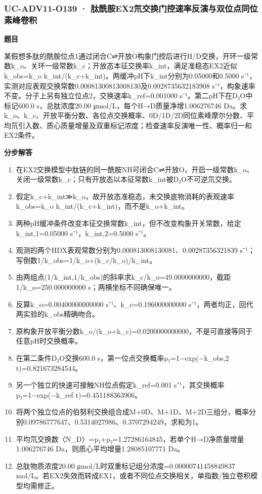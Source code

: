 \documentclass[UTF8,11pt,a4paper]{ctexart}
\begin{document}
\subsubsection*{UC-ADV11-O139 · 肽酰胺EX2氘交换门控速率反演与双位点同位素峰卷积}
\noindent\textbf{题目}\par
某假想多肽的酰胺位点1通过闭合C⇌开放O构象门控后进行H/D交换，开环一级常数k\_o、关环一级常数k\_c；开放态本征交换率k\_int，满足准稳态EX2近似k\_obs=k\_o k\_int/(k\_c+k\_int)。两缓冲pH下k\_int分别为0.05000和0.5000 s⁻¹，实测对应表观交换常数0.00081300813008130及0.0028735632183908 s⁻¹，构象速率不变。分子上另有独立位点2，交换速率k\_ref=0.001000 s⁻¹。第二pH下在D₂O中标记600.0 s，总肽浓度20.00 μmol/L，每个H→D质量净增1.006276746 Da。求k\_o、k\_c、开放平衡分数、各位点交换概率、0D/1D/2D同位素峰摩尔分数、平均氘引入数、质心质量增量及双重标记浓度；检查速率反演唯一性、概率归一和EX2条件。\par
\medskip\noindent\textbf{分步解答}
\begin{enumerate}
\item 在EX2交换模型中肽链的同一酰胺NH可闭合C⇌开放O，开启一级常数k\_o、关闭一级常数k\_c；只有开放态以本征常数k\_int被D₂O不可逆氘交换。
\item 假定k\_c+k\_int≫k\_o，故开放态准稳态，未交换底物消耗的表观速率k\_obs=k\_o k\_int/(k\_c+k\_int)，而不是k\_o+k\_int。
\item 两种pH缓冲条件改变本征交换常数k\_int，但不改变构象开关常数，给定k\_int,1=0.05000 s⁻¹，k\_int,2=0.5000 s⁻¹。
\item 观测的两个HDX表观常数分别为0.000813008130081、0.00287356321839 s⁻¹；写倒数1/k\_obs=1/k\_o+(k\_c/k\_o)/k\_int。
\item 由两组点(1/k\_int,1/k\_obs)的斜率求k\_c/k\_o=49.0000000000，截距1/k\_o=250.000000000 s；两横坐标不同确保唯一。
\item 反算k\_o=0.00400000000000 s⁻¹、k\_c=0.196000000000 s⁻¹，两者均正，回代两实验的k\_obs精确吻合。
\item 原构象开放平衡分数k\_o/(k\_o+k\_c)=0.0200000000000，不是可直接等同于任意pH时交换概率。
\item 在第二条件D₂O交换600.0 s，第一位点交换概率p₁=1−exp(−k\_obs,2 t)=0.821673284544。
\item 另一个独立的快速可接触NH位点假定k\_ref=0.001 s⁻¹，其交换概率p₂=1−exp(−k\_ref t)=0.451188363906。
\item 将两个独立位点的伯努利交换组合成M+0D、M+1D、M+2D三组分，概率分别0.09786777647、0.5314027986、0.3707294249，求和为1。
\item 平均氘交换数〈N\_D〉=p₁+p₂=1.27286164845，若单个H→D净质量增量1.006276746 Da，则质心平均增量1.28085107771 Da。
\item 总肽物质浓度20.00 μmol/L时双重标记组分浓度=0.00000741458849837 mol/L。若EX2失效而转成EX1，或者不同位点交换相关，单指数/独立卷积模型均需修正。
\end{enumerate}
\end{document}
